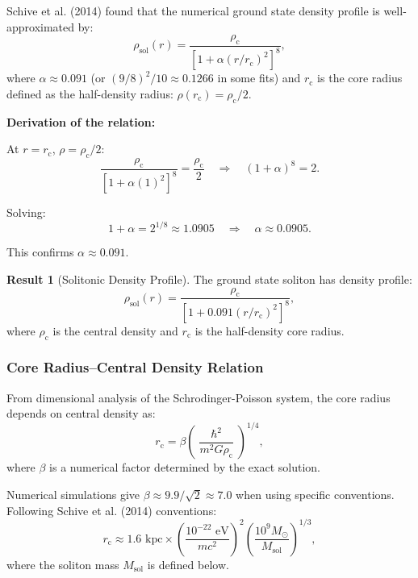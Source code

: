 \documentclass[11pt,a4paper]{article}
\newcommand{\hbar}{\ensuremath{\hslash}}
\newcommand{\Msun}{\ensuremath{M_{\odot}}}
\newcommand{\Msol}{\ensuremath{M_{\mathrm{sol}}}}
\newcommand{\rc}{\ensuremath{r_{\mathrm{c}}}}
\newcommand{\rhoc}{\ensuremath{\rho_{\mathrm{c}}}}
\theoremstyle{definition}
\newtheorem{result}{Result}
\theoremstyle{remark}
\begin{document}
Schive et al. (2014) found that the numerical ground state density profile is well-approximated by:
\begin{equation}
\label{eq:soliton_profile}
\boxed{\rho_{\mathrm{sol}}(r) = \frac{\rhoc}{\left[1 + \alpha\left(r/\rc\right)^2\right]^8},}
\end{equation}
where $\alpha \approx 0.091$ (or $(9/8)^2/10 \approx 0.1266$ in some fits) and $\rc$ is the core radius defined as the half-density radius: $\rho(\rc) = \rhoc/2$.

\textbf{Derivation of the relation:}

At $r = \rc$, $\rho = \rhoc/2$:
\begin{equation}
\frac{\rhoc}{[1 + \alpha(1)^2]^8} = \frac{\rhoc}{2} \quad \Rightarrow \quad (1 + \alpha)^8 = 2.
\end{equation}

Solving:
\begin{equation}
1 + \alpha = 2^{1/8} \approx 1.0905 \quad \Rightarrow \quad \alpha \approx 0.0905.
\end{equation}

This confirms $\alpha \approx 0.091$.

\begin{result}[Solitonic Density Profile]
The ground state soliton has density profile:
\begin{equation}
\boxed{\rho_{\mathrm{sol}}(r) = \frac{\rhoc}{\left[1 + 0.091\left(r/\rc\right)^2\right]^8},}
\end{equation}
where $\rhoc$ is the central density and $\rc$ is the half-density core radius.
\end{result}

\subsubsection{Core Radius--Central Density Relation}

From dimensional analysis of the Schrodinger-Poisson system, the core radius depends on central density as:
\begin{equation}
\label{eq:rc_rhoc}
\rc = \beta \left(\frac{\hbar^2}{m^2 G \rhoc}\right)^{1/4},
\end{equation}
where $\beta$ is a numerical factor determined by the exact solution.

Numerical simulations give $\beta \approx 9.9/\sqrt{2} \approx 7.0$ when using specific conventions. Following Schive et al. (2014) conventions:
\begin{equation}
\boxed{\rc \approx 1.6 \text{ kpc} \times \left(\frac{10^{-22} \text{ eV}}{mc^2}\right)^2 \left(\frac{10^9 \Msun}{\Msol}\right)^{1/3},}
\end{equation}
where the soliton mass $\Msol$ is defined below.
\end{document}
